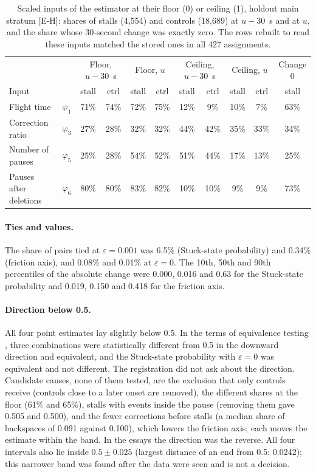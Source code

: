 \begin{table}
  \caption{Scaled inputs of the estimator at their floor (0) or ceiling (1), holdout main stratum [E-H]: shares of stalls
  (4,554) and controls (18,689) at $u - 30$~s and at $u$, and the share whose 30-second change was exactly zero. The rows rebuilt to read these inputs matched the stored ones in all
  427 assignments.}
  \label{tab:phi}
  \centering\footnotesize
  \setlength{\tabcolsep}{3pt}
  \begin{tabular}{l l cccc cccc c}
    \toprule
    & & \multicolumn{2}{c}{Floor, $u - 30$~s} & \multicolumn{2}{c}{Floor, $u$} & \multicolumn{2}{c}{Ceiling, $u - 30$~s} & \multicolumn{2}{c}{Ceiling, $u$} & Change 0 \\
    Input & & stall & ctrl & stall & ctrl & stall & ctrl & stall & ctrl & stall \\
    \midrule
    Flight time & $\varphi_1$ & 71\% & 74\% & 72\% & 75\% & 12\% & 9\% & 10\% & 7\% & 63\% \\
    Correction ratio & $\varphi_3$ & 27\% & 28\% & 32\% & 32\% & 44\% & 42\% & 35\% & 33\% & 34\% \\
    Number of pauses & $\varphi_5$ & 25\% & 28\% & 54\% & 52\% & 51\% & 44\% & 17\% & 13\% & 25\% \\
    Pauses after deletions & $\varphi_6$ & 80\% & 80\% & 83\% & 82\% & 10\% & 10\% & 9\% & 9\% & 73\% \\
    \bottomrule
  \end{tabular}
\end{table}

\paragraph{Ties and values.} The share of pairs tied at $\varepsilon = 0.001$ was 6.5\% (Stuck-state probability) and
0.34\% (friction axis), and 0.08\% and 0.01\% at $\varepsilon = 0$. The 10th, 50th and 90th percentiles of the absolute
change were 0.000, 0.016 and 0.63 for the Stuck-state probability and 0.019, 0.150 and 0.418 for the friction axis.

\paragraph{Direction below 0.5.} All four point estimates lay slightly below 0.5. In the terms of equivalence testing
\cite{lakens2018equivalence}, three combinations were statistically different from 0.5 in the downward direction and
equivalent, and the Stuck-state probability with $\varepsilon = 0$ was equivalent and not different. The registration
did not ask about the direction. Candidate causes, none of them tested, are the exclusion that only controls receive
(controls close to a later onset are removed), the different shares at the floor (61\% and 65\%), stalls with events
inside the pause (removing them gave 0.505 and 0.500), and the fewer corrections before stalls (a median share of
backspaces of 0.091 against 0.100), which lowers the friction axis; each moves the estimate within the band. In the essays the
direction was the reverse. All four intervals also lie inside $0.5 \pm 0.025$ (largest distance of an end from 0.5:
0.0242); this narrower band was found after the data were seen and is not a decision.

